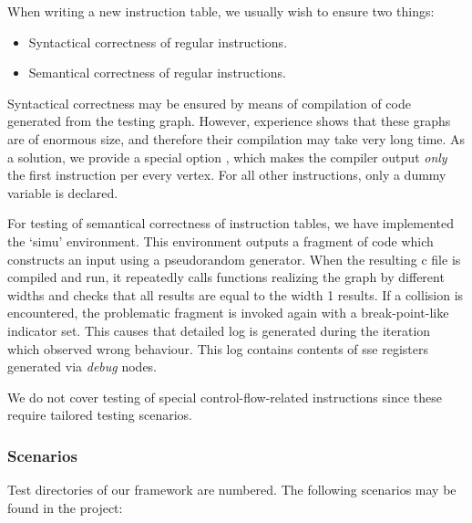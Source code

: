When writing a new instruction table, we usually wish to ensure two things:
\begin{itemize}
  \item Syntactical correctness of regular instructions.
  \item Semantical correctness of regular instructions.
\end{itemize}

Syntactical correctness may be ensured by means of compilation of code generated from the testing graph. However, experience shows that these graphs are of enormous size, and therefore their compilation may take very long time. As a solution, we provide a special option , which makes the compiler output \emph{only} the first instruction per every vertex. For all other instructions, only a dummy variable is declared.

For testing of semantical correctness of instruction tables, we have implemented the `simu' environment. This environment outputs a fragment of code which constructs an input using a pseudorandom generator. When the resulting c file is compiled and run, it repeatedly calls functions realizing the graph by different widths and checks that all results are equal to the width 1 results. If a collision is encountered, the problematic fragment is invoked again with a break-point-like indicator set. This causes that detailed log is generated during the iteration which observed wrong behaviour. This log contains contents of sse registers generated via \emph{debug} nodes.

We do not cover testing of special control-flow-related instructions since these require tailored testing scenarios.


\subsubsection{Scenarios}

Test directories of our framework are numbered. The following scenarios may be found in the project:

